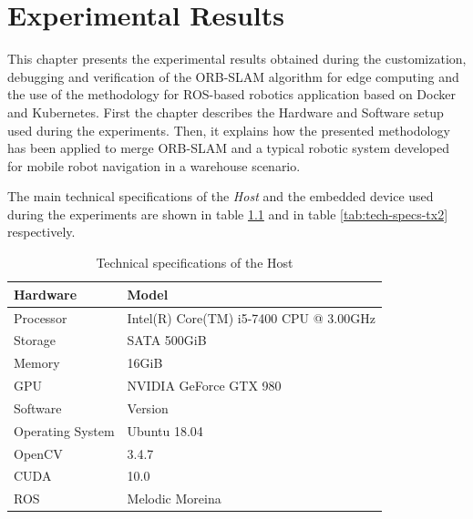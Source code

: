\chapter{Experimental Results} \label{chap:experimental-results}
This chapter presents the experimental results obtained during the customization, debugging and verification of the ORB-SLAM algorithm for edge computing and the use of the methodology for ROS-based robotics application based on Docker and Kubernetes.
First the chapter describes the Hardware and Software setup used during the experiments. Then, it explains how the presented methodology has been applied to merge ORB-SLAM and a typical robotic system developed for mobile robot navigation in a warehouse scenario.

The main technical specifications of the \textit{Host} and the embedded device used during the experiments are shown in table \ref{tab:tech-specs-host} and in table \ref{tab:tech-specs-tx2} respectively. 

\begin{table}[htbp]
	\centering
	\begin{tabularx}{\linewidth}{|l|X|}
		\hline
		\rowcolor{Gray}
		Hardware         & Model \\
		\hline
		Processor        & Intel(R) Core(TM) i5-7400 CPU @ 3.00GHz \\
		Storage          & SATA 500GiB \\
		Memory           & 16GiB \\
		GPU              & NVIDIA GeForce GTX 980 \\
		\hline
		\rowcolor{Gray}
		Software         & Version \\
		\hline
		Operating System & Ubuntu 18.04 \\
		OpenCV           & 3.4.7 \\
		CUDA             & 10.0 \\
		ROS              & Melodic Moreina \\
		\hline
	\end{tabularx}
	\caption{Technical specifications of the Host \label{tab:tech-specs-host}}
\end{table}

